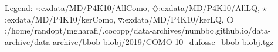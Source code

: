 Legend: {\color{NavyBlue}$\circ$}:exdata/MD/P4K10/AllComo, {\color{Magenta}$\diamondsuit$}:exdata/MD/P4K10/AllLQ, {\color{Orange}$\star$}:exdata/MD/P4K10/kerComo, {\color{CornflowerBlue}$\triangledown$}:exdata/MD/P4K10/kerLQ, {\color{red}$\varhexagon$}:/home/randopt/mgharafi/.cocopp/data-archives/numbbo.github.io/data-archive/data-archive/bbob-biobj/2019/COMO-10\_dufosse\_bbob-biobj.tgz